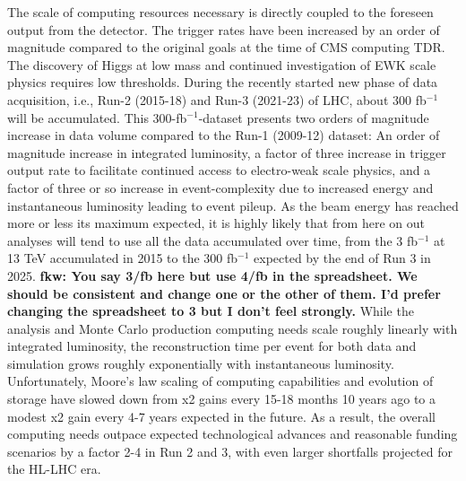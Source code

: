 \documentclass[11pt,a4paper]{article}
\begin{document}
The scale of computing resources necessary is directly coupled to the
foreseen output from the detector.  The trigger rates have been
increased by an order of magnitude compared to the original goals at
the time of CMS computing TDR. The discovery of Higgs at low mass and
continued investigation of EWK scale physics requires low thresholds.
During the recently started new
phase of data acquisition, i.e., Run-2 (2015-18) and Run-3 (2021-23)
of LHC, about 300 fb$^{-1}$ will be accumulated. This
300-fb$^{-1}$-dataset presents two orders of magnitude increase in
data volume compared to the Run-1 (2009-12) dataset: An order of magnitude
increase in integrated luminosity, a factor of three increase in
trigger output rate to facilitate continued access to electro-weak
scale physics, and a factor of three or so increase in
event-complexity due to increased energy and instantaneous luminosity
leading to event pileup.
As the beam energy has reached more or less its maximum expected, it
is highly likely that from here on out analyses will tend to use all
the data accumulated over time, from the 3 fb$^{-1}$ at 13 TeV accumulated in 2015 to
the 300 fb$^{-1}$ expected by the end of Run 3 in 2025.
{\bf fkw: You say 3/fb here but use 4/fb in the spreadsheet. We should be consistent and change one or the other of them. I'd prefer changing the spreadsheet to 3 but I don't feel strongly.}
While the analysis and Monte Carlo production computing needs scale
roughly linearly with integrated luminosity, the reconstruction time
per event for both data and simulation grows roughly exponentially
with instantaneous luminosity.  
Unfortunately, Moore's law scaling of computing capabilities and evolution of
storage have slowed down from x2 gains every 15-18 months 10 years ago to a modest x2 gain every 4-7 years expected in the future.
As a result, the overall computing
needs outpace expected technological advances and reasonable 
funding scenarios by a factor 2-4 in Run 2 and 3, with even larger shortfalls projected for the HL-LHC era.
\end{document}
